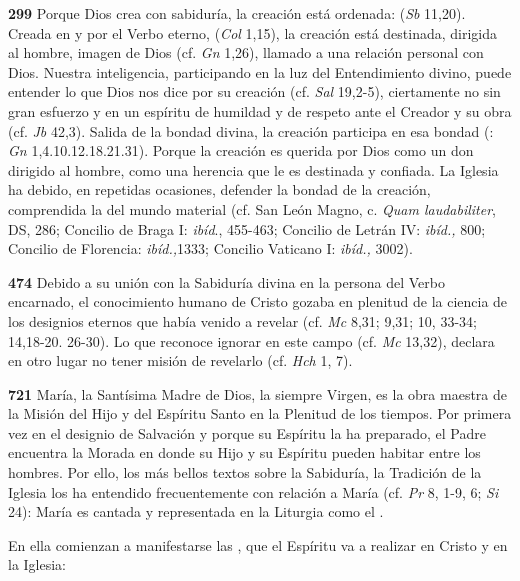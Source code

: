 \begin{body}
\begin{body}
\textbf{299} Porque Dios crea con sabiduría, la creación está ordenada:  (\emph{Sb} 11,20). Creada en y por el Verbo eterno,  (\emph{Col} 1,15), la creación está destinada, dirigida al hombre, imagen de Dios (cf. \emph{Gn} 1,26), llamado a una relación personal con Dios. Nuestra inteligencia, participando en la luz del Entendimiento divino, puede entender lo que Dios nos dice por su creación (cf. \emph{Sal} 19,2-5), ciertamente no sin gran esfuerzo y en un espíritu de humildad y de respeto ante el Creador y su obra (cf. \emph{Jb} 42,3). Salida de la bondad divina, la creación participa en esa bondad (: \emph{Gn} 1,4.10.12.18.21.31). Porque la creación es querida por Dios como un don dirigido al hombre, como una herencia que le es destinada y confiada. La Iglesia ha debido, en repetidas ocasiones, defender la bondad de la creación, comprendida la del mundo material (cf. San León Magno, c. \emph{Quam laudabiliter}, DS, 286; Concilio de Braga I: \emph{ibíd}., 455-463; Concilio de Letrán IV: \emph{ibíd.,} 800; Concilio de Florencia: \emph{ibíd.,}1333; Concilio Vaticano I: \emph{ibíd.,} 3002).

\textbf{474} Debido a su unión con la Sabiduría divina en la persona del Verbo encarnado, el conocimiento humano de Cristo gozaba en plenitud de la ciencia de los designios eternos que había venido a revelar (cf. \emph{Mc} 8,31; 9,31; 10, 33-34; 14,18-20. 26-30). Lo que reconoce ignorar en este campo (cf. \emph{Mc} 13,32), declara en otro lugar no tener misión de revelarlo (cf. \emph{Hch} 1, 7).

\textbf{}

\textbf{721} María, la Santísima Madre de Dios, la siempre Virgen, es la obra maestra de la Misión del Hijo y del Espíritu Santo en la Plenitud de los tiempos. Por primera vez en el designio de Salvación y porque su Espíritu la ha preparado, el Padre encuentra la Morada en donde su Hijo y su Espíritu pueden habitar entre los hombres. Por ello, los más bellos textos sobre la Sabiduría, la Tradición de la Iglesia los ha entendido frecuentemente con relación a María (cf. \emph{Pr} 8, 1-9, 6; \emph{Si} 24): María es cantada y representada en la Liturgia como el .

En ella comienzan a manifestarse las , que el Espíritu va a realizar en Cristo y en la Iglesia:


\end{body}
\end{body}
